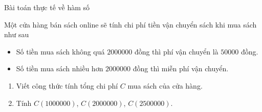 \begin{dang}{Bài toán thực tế về hàm số}

\end{dang}
\viduminhhoa
\begin{vd}%
	Một cửa hàng bán sách online sẽ tính chi phí tiền vận chuyển sách khi mua sách như sau
	\begin{itemize}
		\item Số tiền mua sách không quá $2000000$ đồng thì phí vận chuyển là $50000$ đồng.
		\item Số tiền mua sách nhiều hơn $2000000$ đồng thì miễn phí vận chuyển.
	\end{itemize}
	\begin{enumerate}
		\item Viết công thức tính tổng chi phí $C$ mua sách của cửa hàng.
		\item Tính $C(1000000)$, $C(2000000)$, $C(2500000)$.
	\end{enumerate}
\end{vd}
